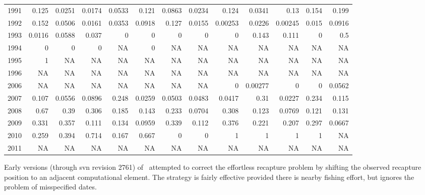 \begin{sidewaystable}
{\begin{center}
\begin{tabular}{lrrrrrrrrrrrr}
 1991 &    0.125 &   0.0251 &   0.0174 &   0.0533 &    0.121 & 0.0863 &   0.0234 &    0.124 &   0.0341 &     0.13 &    0.154 & 0.199\\
 1992 &    0.152 &   0.0506 &   0.0161 &   0.0353 &   0.0918 & 0.127 &   0.0155 &  0.00253 &   0.0226 &  0.00245 &    0.015 & 0.0916\\
 1993 &   0.0116 &   0.0588 &    0.037 &        0 &        0 & 0 &        0 &        0 &    0.143 &    0.111 &        0 &      0.5\\
 1994 &        0 &        0 &        0 &       NA &        0 & NA &       NA &       NA &       NA &       NA &       NA &       NA\\
 1995 &        1 &       NA &       NA &       NA &       NA & NA &       NA &       NA &       NA &       NA &       NA &       NA\\
 1996 &       NA &       NA &       NA &       NA &       NA & NA &       NA &       NA &       NA &       NA &       NA &       NA\\
\hline
 2006 &       NA &       NA&        NA &       NA&        NA& NA&        NA &        0&   0.00277&         0 &        0 &   0.0562\\
 2007 &    0.107 &   0.0556&    0.0896 &    0.248&    0.0259& 0.0503&    0.0483 &   0.0417&      0.31&    0.0227 &    0.234 & 0.115\\
 2008 &     0.67 &     0.39&     0.306 &    0.185&     0.143& 0.233&    0.0704 &    0.308&     0.123&    0.0769 &    0.121 & 0.131\\
 2009 &    0.331 &    0.357&     0.111 &    0.134&    0.0959& 0.339&     0.112 &    0.376&     0.221&     0.207 &    0.297 & 0.0667\\
 2010 &    0.259 &    0.394&     0.714 &    0.167&     0.667& 0&         0 &        1&         1&         1 &        1 &       NA\\
 2011 &       NA &       NA&        NA &       NA&        NA& NA&        NA &       NA&        NA&        NA &       NA &       NA\\
\hline
\end{tabular}
\end{center}
} %
\end{sidewaystable}



Early versions (through svn revision 2761) of \TT\ attempted to
correct the effortless recapture problem by shifting the observed
recapture position to an
adjacent computational element. The strategy is fairly effective
provided there is nearby fishing effort, but ignores the problem of
misspecified dates.

